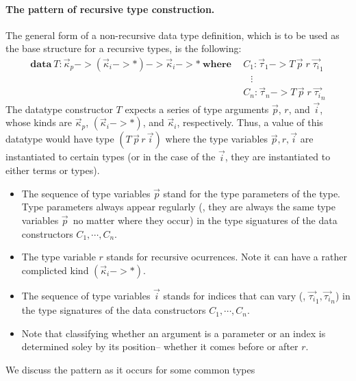 \paragraph{The pattern of recursive type construction.}
The general form of a non-recursive data type definition, which is to be used
as the base structure for a recursive types, is the following:
\begin{align*}
\textbf{data}~ T : \vec{\kappa}_p -> (\vec{\kappa}_i -> *) ->
                                      \vec{\kappa}_i -> *
~\textbf{where}~
&~ C_1 : \vec{\tau}_1 -> T\,\vec{p}\;r\;\vec{\tau_i}_{1} \\
&\quad \vdots \\
&~ C_n : \vec{\tau}_n -> T\,\vec{p}\;r\;\vec{\tau_i}_{n}
\end{align*}
The datatype constructor $T$ expects a series of type arguments $\vec{p}$, $r$,
and $\vec{i}$, whose kinds are $\vec{\kappa}_p$, $(\vec{\kappa}_i -> *)$, and
$\vec{\kappa}_i$, respectively. Thus, a value of this datatype would have
type $(T\,\vec{p}\,r\,\vec{i})$ where the type variables $\vec{p},r,\vec{i}$
are instantiated to certain types (or in the case of the $\vec{i}$, they are instantiated to either terms or types).
\begin{itemize}
\item The sequence of type variables $\vec{p}$ stand for the type parameters of the
type. Type parameters always appear regularly 
(\ie, they are always the same type variables $\vec{p}$\
no matter where they occur) in the type siguatures of
the data constructors $C_1,\cdots,C_n$. 

\item The type variable $r$ stands for
recursive ocurrences. Note it can have a rather complicted kind $(\vec{\kappa}_i -> *)$.

\item The sequence of type variables $\vec{i}$ stands for indices
that can vary (\eg, $\vec{\tau_i}_1,\vec{\tau_i}_n$) in the type signatures of
the data constructors $C_1,\cdots,C_n$. 

\item Note that classifying whether an argument is a parameter or an index is
determined soley by its position-- whether it comes before or after $r$.

\end{itemize}
We discuss the pattern as it occurs for some common types
